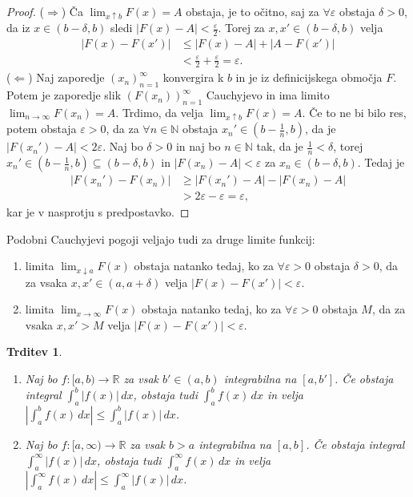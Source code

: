 \documentclass[10pt, a4paper]{article}
\newtheorem{trditev}[izr]{Trditev}
\newenvironment{noticeC}{%
  \tcolorbox[%
  notitle,
  empty,
  enhanced,  %
  breakable,
  coltext=black, 
  fontupper=\rmfamily,
  noparskip,
  sharp corners,
  boxrule=-1pt,  %
  frame hidden,
  left=7pt,  %
  right=7pt,
  top=5pt,
  bottom=5pt,
  before skip=2.5ex plus 2pt,
  after skip=2.5ex plus 2pt,
  overlay unbroken and last={%
  },
  ]}
{\endtcolorbox}
\newenvironment{dokaz}%
  {\begin{noticeC}\begin{proof}}%
  {\end{proof}\end{noticeC}}
\newcommand{\N}{\mathbb {N}}
\newcommand{\R}{\mathbb {R}}
\newcommand{\limf}[3]{\lim_{#1 \to #2} {#3}}
\newcommand{\rlimf}[3]{\lim_{#1 \downarrow #2} {#3}}
\newcommand{\llimf}[3]{\lim_{#1 \uparrow #2} {#3}}
\begin{document}
\begin{dokaz}
    ($\Rightarrow$) Ča $\llimf{x}{b}{F(x)} = A$ obstaja, je to očitno, saj za $\forall \varepsilon$ obstaja $\delta > 0$, da iz $x \in (b - \delta, b)$ sledi $|F(x) - A| < \frac{\varepsilon}{2}$.
    Torej za $x, x' \in (b - \delta, b)$ velja 
    \begin{align*}
        |F(x) - F(x')| & \leq |F(x) - A| + |A - F(x')|\\
        &< \frac{\varepsilon}{2} + \frac{\varepsilon}{2} = \varepsilon.
    \end{align*}
    ($\Leftarrow$) Naj zaporedje $(x_n)_{n = 1} ^{\infty}$ konvergira k $b$ in je iz definicijskega območja $F$.
    Potem je zaporedje slik $(F(x_n))_{n= 1} ^{\infty}$ Cauchyjevo in ima limito $\limf{n}{\infty}{F(x_n)} = A.$
    Trdimo, da velja $\llimf{x}{b}{F(x)} = A.$
    Če to ne bi bilo res, potem obstaja $\varepsilon > 0$, da za $\forall n \in \N$ obstaja $x_n ' \in \left( b - \frac{1}{n}, b \right)$, da je $|F(x_n ') - A| < 2 \varepsilon$.
    Naj bo $\delta > 0$ in naj bo $n \in \N$ tak, da je $\frac{1}{n} < \delta$, torej $x_n ' \in \left(b - \frac{1}{n}, b\right) \subseteq (b - \delta, b)$ in $|F(x_n) - A| < \varepsilon$ za $x_n \in (b - \delta, b)$.
    Tedaj je \begin{align*}
        |F(x_n ') - F(x_n)| &\geq |F(x_n ') - A| - |F(x_n) - A|\\
        &> 2 \varepsilon - \varepsilon = \varepsilon,
    \end{align*}
    kar je v nasprotju s predpostavko.
\end{dokaz}

Podobni Cauchyjevi pogoji veljajo tudi za druge limite funkcij:
\begin{enumerate}
    \item limita $\rlimf{x}{a}{F(x)}$ obstaja natanko tedaj, ko za $\forall \varepsilon > 0$ obstaja $\delta > 0$, da za vsaka $x, x' \in (a, a + \delta)$ velja $|F(x) - F(x')| < \varepsilon$.
    \item limita $\limf{x}{\infty}{F(x)}$ obstaja natanko tedaj, ko za $\forall \varepsilon > 0$ obstaja $M$, da za vsaka $x, x' > M$ velja $|F(x) - F(x')| < \varepsilon$.
\end{enumerate}

\begin{trditev}
    \begin{enumerate}
        \item Naj bo $f: [a, b) \rightarrow \R$ za vsak $b' \in (a, b)$ integrabilna na $[a, b']$.
        Če obstaja integral $\int_a ^b |f(x)|\,dx$, obstaja tudi $\int_a ^b f(x)\,dx$ in velja $\left| \int_a ^b f(x)\,dx \right| \leq \int_a ^b |f(x)|\,dx$.
        \item Naj bo $f: [a, \infty) \rightarrow \R$ za vsak $b > a$ integrabilna na $[a, b]$.
        Če obstaja integral $\int_a ^{\infty} |f(x)|\,dx$, obstaja tudi $\int_a ^{\infty} f(x)\,dx$ in velja $\left| \int_a ^{\infty} f(x)\,dx \right| \leq \int_a ^{\infty} |f(x)|\,dx$.
    \end{enumerate}
\end{trditev}
\end{document}

